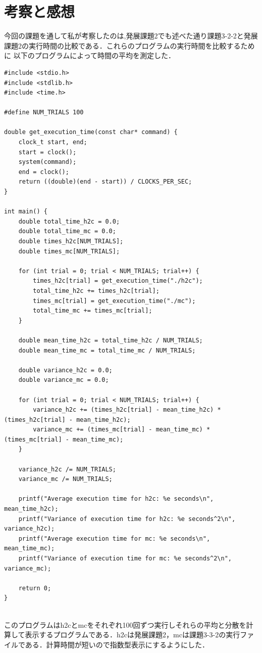 \documentclass[dvipdfmx]{jarticle}
\begin{document}
\section{考察と感想}
今回の課題を通して私が考察したのは,発展課題2でも述べた通り課題3-2-2と発展課題2の実行時間の比較である．これらのプログラムの実行時間を比較するために
以下のプログラムによって時間の平均を測定した．
\begin{lstlisting}
#include <stdio.h>
#include <stdlib.h>
#include <time.h>

#define NUM_TRIALS 100

double get_execution_time(const char* command) {
    clock_t start, end;
    start = clock();
    system(command);
    end = clock();
    return ((double)(end - start)) / CLOCKS_PER_SEC;
}

int main() {
    double total_time_h2c = 0.0;
    double total_time_mc = 0.0;
    double times_h2c[NUM_TRIALS];
    double times_mc[NUM_TRIALS];

    for (int trial = 0; trial < NUM_TRIALS; trial++) {
        times_h2c[trial] = get_execution_time("./h2c");
        total_time_h2c += times_h2c[trial];
        times_mc[trial] = get_execution_time("./mc");
        total_time_mc += times_mc[trial];
    }

    double mean_time_h2c = total_time_h2c / NUM_TRIALS;
    double mean_time_mc = total_time_mc / NUM_TRIALS;

    double variance_h2c = 0.0;
    double variance_mc = 0.0;

    for (int trial = 0; trial < NUM_TRIALS; trial++) {
        variance_h2c += (times_h2c[trial] - mean_time_h2c) * (times_h2c[trial] - mean_time_h2c);
        variance_mc += (times_mc[trial] - mean_time_mc) * (times_mc[trial] - mean_time_mc);
    }

    variance_h2c /= NUM_TRIALS;
    variance_mc /= NUM_TRIALS;

    printf("Average execution time for h2c: %e seconds\n", mean_time_h2c);
    printf("Variance of execution time for h2c: %e seconds^2\n", variance_h2c);
    printf("Average execution time for mc: %e seconds\n", mean_time_mc);
    printf("Variance of execution time for mc: %e seconds^2\n", variance_mc);

    return 0;
}
    
\end{lstlisting}
このプログラムはh2cとmcをそれぞれ100回ずつ実行しそれらの平均と分散を計算して表示するプログラムである．h2cは発展課題2，mcは課題3-3-2の実行ファイルである．計算時間が短いので指数型表示にするようにした．
\end{document}
